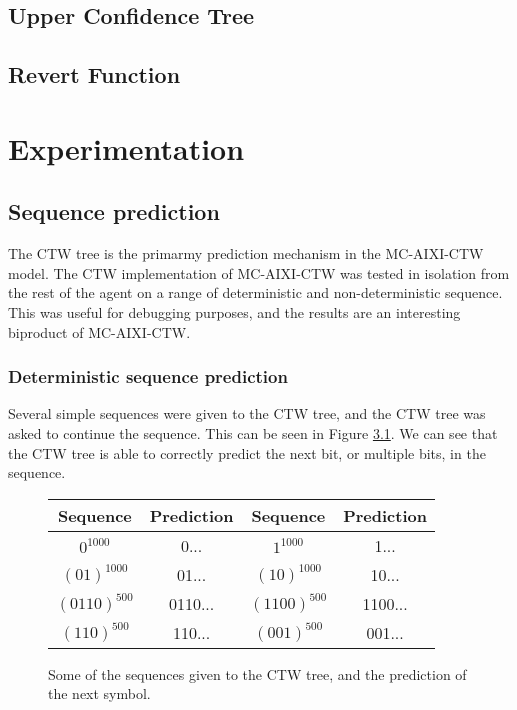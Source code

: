 \documentclass[pdftex,twoside,a4paper]{report}
\newcommand{\bcen}{\begin{center}}
\newcommand{\ecen}{\end{center}}
\newcommand{\mac}{MC-AIXI-CTW}
\begin{document}
\section{Upper Confidence Tree}

\section{Revert Function}
\chapter{Experimentation}
\section{Sequence prediction}
\label{sec:Sequence prediction}
The CTW tree is the primarmy prediction mechanism in the \mac{} model. The CTW implementation of \mac{} was tested in isolation from the rest of the agent on a range of deterministic and non-deterministic sequence. This was useful for debugging purposes, and the results are an interesting biproduct of \mac{}.
\subsection{Deterministic sequence prediction}
Several simple sequences were given to the CTW tree, and the CTW tree was asked to continue the sequence. This can be seen in Figure \ref{tab:det_seq_pred}. We can see that the CTW tree is able to correctly predict the next bit, or multiple bits, in the sequence.

\begin{figure}
\bcen
\bgroup
\def\arraystretch{1.5}
\begin{tabular}{|cc|cc|}
\hline
Sequence & Prediction & Sequence & Prediction\\
\hline $0^{1000}$ & 0... & $1^{1000}$ & 1...\\ 
\hline $(01)^{1000}$ & 01... & $(10)^{1000}$ & 10...\\ 
\hline $(0110)^{500}$ & 0110... & $(1100)^{500}$ & 1100...\\ 
\hline $(110)^{500}$ & 110... & $(001)^{500}$ & 001...\\
\hline 
\end{tabular} 
\egroup
\ecen
\caption{Some of the sequences given to the CTW tree, and the prediction of the next symbol.}
\label{tab:det_seq_pred}
\end{figure}
\end{document}
